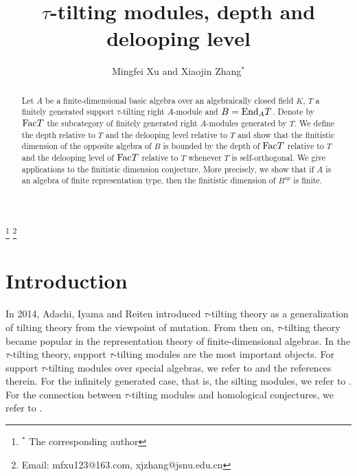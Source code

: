 \documentclass[a4paper]{amsart}
\theoremstyle{definition}
\theoremstyle{remark}
\numberwithin{equation}{section}
\begin{document}
\title[$\tau$-tilting modules, depth and  delooping level]{$\tau$-tilting modules, depth and delooping level}
\author[Xu and Zhang] {Mingfei Xu and Xiaojin Zhang$^*$}


\makeatletter
{}
\makeatother


\thanks{$^*$ The corresponding author}
\thanks{Email: mfxu123@163.com, xjzhang@jsnu.edu.cn}

\maketitle


\dedicatory{}%
\commby{}%
\begin{abstract}
Let $A$ be a finite-dimensional basic algebra over an algebraically closed field $K$, $T$ a finitely generated support $\tau$-tilting right $A$-module and $B={\rm End}_A T$. Denote by ${\rm Fac}T$ the subcategory of finitely generated right $A$-modules generated by $T$. We define the depth relative to $T$ and the delooping level relative to $T$ and show that the finitistic dimension of the opposite algebra of $B$ is bounded by the depth of $\textup{Fac}T$ relative to $T$ and the delooping level of $\textup{Fac}T$ relative to $T$ whenever $T$ is self-orthogonal. We give applications to the finitistic dimension conjecture. More precisely, we show that if $A$ is an algebra of finite representation type, then the finitistic dimension of $B^{op}$ is finite.
\end{abstract}


\section{Introduction}

In 2014, Adachi, Iyama and Reiten \cite{AIR} introduced $\tau$-tilting theory as a generalization of tilting theory from the viewpoint of mutation. From then on, $\tau$-tilting theory became popular in the representation theory of finite-dimensional algebras. In the $\tau$-tilting theory, support $\tau$-tilting modules are the most important objects. For support $\tau$-tilting modules over special algebras, we refer to \cite{A, M, DIJ, IZ} and the references therein. For the infinitely generated case, that is, the silting modules, we refer to \cite{AnMV}. For the connection between $\tau$-tilting modules and homological conjectures, we refer to \cite{CLZZ, Z}.
\end{document}
